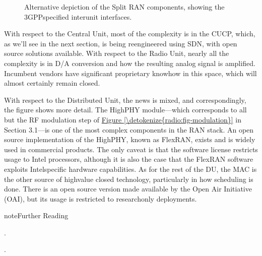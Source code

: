 \documentclass[a4paper,11pt,english]{sphinxmanual}
\let\sphinxpxdimen\pdfpxdimen\else\newdimen\sphinxpxdimen
\begin{document}
\begin{figure}[ht]
\centering
\capstart

\noindent\sphinxincludegraphics[width=150\sphinxpxdimen]{{Slide101}.png}
\caption{Alternative depiction of the Split RAN components, showing the
3GPP\sphinxhyphen{}specified inter\sphinxhyphen{}unit interfaces.}\label{\detokenize{ran:id8}}\label{\detokenize{ran:fig-split-alt}}\end{figure}

\sphinxAtStartPar
With respect to the Central Unit, most of the complexity is in the
CU\sphinxhyphen{}CP, which, as we’ll see in the next section, is being re\sphinxhyphen{}engineered
using SDN, with open source solutions available. With respect to the
Radio Unit, nearly all the complexity is in D/A conversion and how the
resulting analog signal is amplified. Incumbent vendors have
significant proprietary know\sphinxhyphen{}how in this space, which will almost
certainly remain closed.

\sphinxAtStartPar
With respect to the Distributed Unit, the news is mixed, and
correspondingly, the figure shows more detail. The High\sphinxhyphen{}PHY
module—which corresponds to all but the RF modulation step of
\hyperref[\detokenize{radio:fig-modulation}]{Figure \ref{\detokenize{radio:fig-modulation}}} in Section 3.1—is one of the most
complex components in the RAN stack. An open source implementation of
the High\sphinxhyphen{}PHY, known as FlexRAN, exists and is widely used in
commercial products. The only caveat is that the software license
restricts usage to Intel processors, although it is also the case that
the FlexRAN software exploits Intel\sphinxhyphen{}specific hardware capabilities. As
for the rest of the DU, the MAC is the other source of high\sphinxhyphen{}value
closed technology, particularly in how scheduling is done. There is an
open source version made available by the Open Air Initiative (OAI),
but its usage is restricted to research\sphinxhyphen{}only deployments.

\label{\detokenize{ran:reading-du-impl}}
\begin{sphinxadmonition}{note}{Further Reading}

\sphinxAtStartPar
{}.

\sphinxAtStartPar
{}.
\end{sphinxadmonition}
\end{document}
